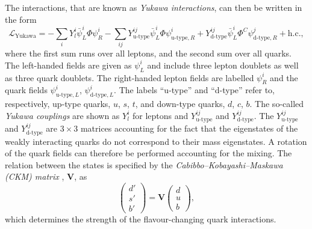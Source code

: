 The interactions, that are known as \emph{Yukawa interactions}, can then be written in the form
\begin{equation}
  \mathcal{L}_\text{Yukawa} = - \sum_{i} Y_l^i \bar{\psi}^{i}_{L} \Phi \psi^{i}_{R} - \sum_{ij} Y_{\text{u-type}}^{ij} \bar{\psi}^{i}_{L} \Phi \psi^{i}_{\text{u-type},R} + Y_{\text{d-type}}^{ij} \bar{\psi}^{i}_{L} \Phi^C \psi^{j}_{\text{d-type}, R} + \text{h.c.}, 
  \label{eq:lyukawa}
\end{equation}
where the first sum runs over all leptons, and the second sum over all quarks.
The left-handed fields are given as $\psi^{i}_{L}$ and include three lepton doublets as well as three quark doublets. 
The right-handed lepton fields are labelled $\psi_R^i$ and the quark fields $\psi^{i}_{\text{u-type},L}$, $\psi^{i}_{\text{d-type},L}$.
The labels ``u-type'' and ``d-type'' refer to, respectively, up-type quarks, $u$, $s$, $t$, and down-type quarks, $d$, $c$, $b$. 
The so-called \emph{Yukawa couplings} are shown as $Y_l^i$ for leptons and $Y_{\text{u-type}}^{ij}$ and $Y_{\text{d-type}}^{ij}$. The $Y_{\text{u-type}}^{ij}$ and $Y_{\text{d-type}}^{ij}$ are $3 \times 3$ matrices accounting for the fact that the eigenstates of the weakly interacting quarks do not correspond to their mass eigenstates. A rotation of the quark fields can therefore be performed accounting for the mixing. 
The relation between the states is specified by the \emph{Cabibbo–Kobayashi–Maskawa (CKM) matrix} \cite{doi:10.1143/PTP.49.652}, $\pmb{V}$, as
\begin{equation}
  \begin{pmatrix}
   d' \\
   s' \\
   b'
 \end{pmatrix}
 = 
 \pmb{V} 
 \begin{pmatrix}
   d \\
   u \\
   b
 \end{pmatrix}, 
\end{equation}
which determines the strength of the flavour-changing quark interactions.


